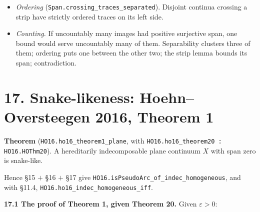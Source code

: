 \documentclass[11pt]{article}
\newcommand{\lean}[1]{\texttt{#1}}
\begin{document}
\begin{itemize}
  \item \emph{Ordering} (\lean{Span.\hspace{0pt}crossing\_\hspace{0pt}traces\_\hspace{0pt}separated}). Disjoint continua crossing a strip have strictly ordered traces on its left side.
  \item \emph{Counting.} If uncountably many images had positive surjective span, one bound would serve uncountably many of them. Separability clusters three of them; ordering puts one between the other two; the strip lemma bounds its span; contradiction.
\end{itemize}

\section*{17. Snake-likeness: Hoehn--Oversteegen 2016, Theorem 1}

\textbf{Theorem} (\lean{HO16.\hspace{0pt}ho16\_\hspace{0pt}theorem1\_\hspace{0pt}plane}, with \lean{HO16.\hspace{0pt}ho16\_\hspace{0pt}theorem20 : HO16.\hspace{0pt}HOThm20}). A hereditarily indecomposable plane continuum $X$ with span zero is snake-like.

Hence \S{}15 $+$ \S{}16 $+$ \S{}17 give \lean{HO16.\hspace{0pt}isPseudoArc\_\hspace{0pt}of\_\hspace{0pt}indec\_\hspace{0pt}homogeneous}, and with \S{}11.4, \lean{HO16.\hspace{0pt}ho16\_\hspace{0pt}indec\_\hspace{0pt}homogeneous\_\hspace{0pt}iff}.

\textbf{17.1 The proof of Theorem 1, given Theorem 20.} Given $\varepsilon > 0$:
\end{document}
